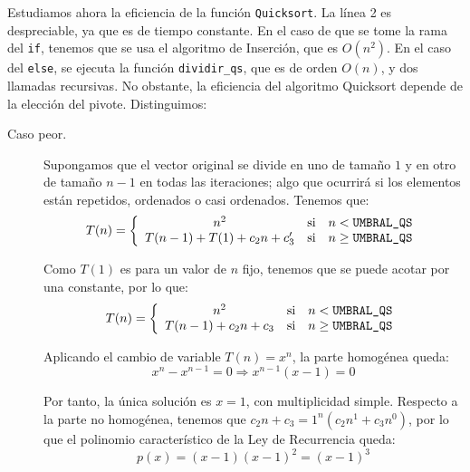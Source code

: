 \documentclass[12pt]{article}
\begin{document}
    Estudiamos ahora la eficiencia de la función \verb|Quicksort|. La línea 2 es despreciable, ya que es de tiempo constante. En el caso de que se tome la rama del \verb|if|, tenemos que se usa el algoritmo de Inserción, que es $O(n^2)$. En el caso del \verb|else|, se ejecuta la función \verb|dividir_qs|, que es de orden $O(n)$, y dos llamadas recursivas. No obstante, la eficiencia del algoritmo Quicksort depende de la elección del pivote. Distinguimos:
    \begin{description}
        \item[Caso peor.] Supongamos que el vector original se divide en uno de tamaño $1$ y en otro de tamaño $n-1$ en todas las iteraciones; algo que ocurrirá si los elementos están repetidos, ordenados o casi ordenados. Tenemos que:
        \begin{equation*}
            T(n) = \left\{
            \begin{array}{ccc}
                n^2 & \text{si} & n< \verb|UMBRAL_QS|\\
                T(n-1) + T(1) + c_2n +c_3' & \text{si} & n\geq \verb|UMBRAL_QS|
            \end{array}
            \right.
        \end{equation*}

        Como $T(1)$ es para un valor de $n$ fijo, tenemos que se puede acotar por una constante, por lo que:
        \begin{equation*}
            T(n) = \left\{
            \begin{array}{ccc}
                n^2 & \text{si} & n< \verb|UMBRAL_QS|\\
                T(n-1) + c_2n +c_3 & \text{si} & n\geq \verb|UMBRAL_QS|
            \end{array}
            \right.
        \end{equation*}

        Aplicando el cambio de variable $T(n)=x^n$, la parte homogénea queda:
        \begin{equation*}
            x^n - x^{n-1} = 0 \Longrightarrow
            x^{n-1}(x-1)=0
        \end{equation*}

        Por tanto, la única solución es $x=1$, con multiplicidad simple. Respecto a la parte no homogénea, tenemos que $c_2n+c_3=1^n(c_2n^1 + c_3n^0)$, por lo que el polinomio característico de la Ley de Recurrencia queda:
        \begin{equation*}
            p(x)=(x-1)(x-1)^2 = (x-1)^3
        \end{equation*}


\end{description}
\end{document}
